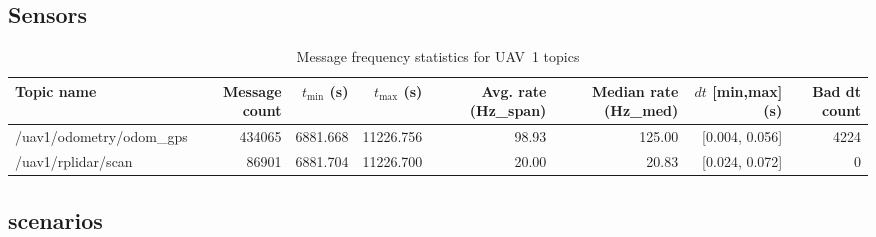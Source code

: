     \subsection{Sensors}
        \begin{table}[H]
            \centering
            \caption{Message frequency statistics for UAV~1 topics}
            \label{tab:freq_stats}
            \begin{adjustbox}{max width=\textwidth}
                \begin{tabular}{lrrrrrrr}
                    \toprule
                    \textbf{Topic name}      & \textbf{Message count} & \textbf{$t_{\min}$ (s)} & \textbf{$t_{\max}$ (s)} & \textbf{Avg. rate (Hz\_span)} & \textbf{Median rate (Hz\_med)} & \textbf{$dt$ [min,max] (s)} & \textbf{Bad dt count} \\
                    \midrule
                    /uav1/odometry/odom\_gps & 434065                 & 6881.668                & 11226.756               & 98.93                         & 125.00                         & [0.004, 0.056]              & 4224                  \\
                    /uav1/rplidar/scan       & 86901                  & 6881.704                & 11226.700               & 20.00                         & 20.83                          & [0.024, 0.072]              & 0                     \\
                    \bottomrule
                \end{tabular}
            \end{adjustbox}
        \end{table}

\subsection{scenarios}
